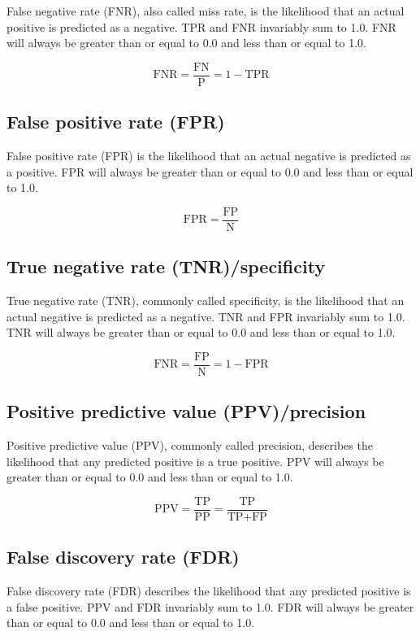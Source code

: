 \documentclass[letterpaper, 12pt]{article}
\begin{document}
False negative rate (FNR), also called miss rate, is the likelihood that an actual positive is predicted as a negative. TPR and FNR invariably sum to 1.0. FNR will always be greater than or equal to 0.0 and less than or equal to 1.0.

$$\textrm{FNR} = \frac{\textrm{FN}}{\textrm{P}} = 1 - \textrm{TPR}$$

\subsection*{False positive rate (FPR)}

False positive rate (FPR) is the likelihood that an actual negative is predicted as a positive. FPR will always be greater than or equal to 0.0 and less than or equal to 1.0.

$$\textrm{FPR} = \frac{\textrm{FP}}{\textrm{N}}$$

\subsection*{True negative rate (TNR)/specificity}

True negative rate (TNR), commonly called specificity, is the likelihood that an actual negative is predicted as a negative. TNR and FPR invariably sum to 1.0. TNR will always be greater than or equal to 0.0 and less than or equal to 1.0.

$$\textrm{FNR} = \frac{\textrm{FP}}{\textrm{N}} = 1 - \textrm{FPR}$$

\subsection*{Positive predictive value (PPV)/precision}

Positive predictive value (PPV), commonly called precision, describes the likelihood that any predicted positive is a true positive. PPV will always be greater than or equal to 0.0 and less than or equal to 1.0.

$$\textrm{PPV} = \frac{\textrm{TP}}{\textrm{PP}} = \frac{\textrm{TP}}{\textrm{TP} + \textrm{FP}}$$

\subsection*{False discovery rate (FDR)}

False discovery rate (FDR) describes the likelihood that any predicted positive is a false positive. PPV and FDR invariably sum to 1.0. FDR will always be greater than or equal to 0.0 and less than or equal to 1.0.
\end{document}
